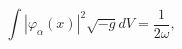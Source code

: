 \begin{equation}
\int \left| \varphi _{\alpha }(x)\right|
^{2}\sqrt{-g}dV=\frac{1}{2\omega }, \label{normcond}
\end{equation}

